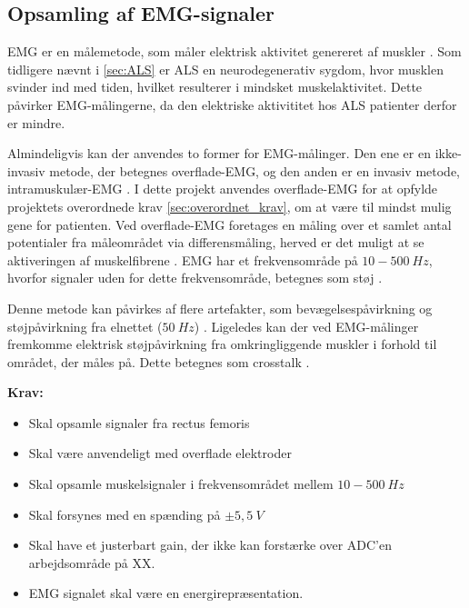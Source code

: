 \subsection{Opsamling af EMG-signaler}
EMG er en målemetode, som måler elektrisk aktivitet genereret af muskler \citep{chowdhury2013}. 
Som tidligere nævnt i \autoref{sec:ALS} er ALS en neurodegenerativ sygdom, hvor musklen svinder ind med tiden, hvilket resulterer i mindsket muskelaktivitet. Dette påvirker EMG-målingerne, da den elektriske aktivititet hos ALS patienter derfor er mindre.

Almindeligvis kan der anvendes to former for EMG-målinger. Den ene er en ikke-invasiv metode, der betegnes overflade-EMG, og den anden er en invasiv metode, intramuskulær-EMG \citep{chowdhury2013, keenan2012}. I dette projekt anvendes overflade-EMG for at opfylde projektets overordnede krav \autoref{sec:overordnet_krav}, om at være til mindst mulig gene for patienten. Ved overflade-EMG foretages en måling over et samlet antal potentialer fra måleområdet via differensmåling, herved er det muligt at se aktiveringen af muskelfibrene \citep{keenan2012}. EMG har et frekvensområde på $10-500~Hz$, hvorfor signaler uden for dette frekvensområde, betegnes som støj \citep{morre2003, keenan2012}.  

Denne metode kan påvirkes af flere artefakter, som bevægelsespåvirkning og støjpåvirkning fra elnettet ($50~Hz$) \citep{keenan2012}.
Ligeledes kan der ved EMG-målinger fremkomme elektrisk støjpåvirkning fra omkringliggende muskler i forhold til området, der måles på. Dette betegnes som crosstalk \citep{keenan2012}. 
\vspace{3mm}

\textbf{Krav:}
\begin{itemize}
\item Skal opsamle signaler fra rectus femoris
\item Skal være anvendeligt med overflade elektroder
\item Skal opsamle muskelsignaler i frekvensområdet mellem $10-500~Hz$
\item Skal forsynes med en spænding på $\pm5,5~V$ 
\item Skal have et justerbart gain, der ikke kan forstærke over ADC'en arbejdsområde på XX.
\item EMG signalet skal være en energirepræsentation.
\end{itemize}